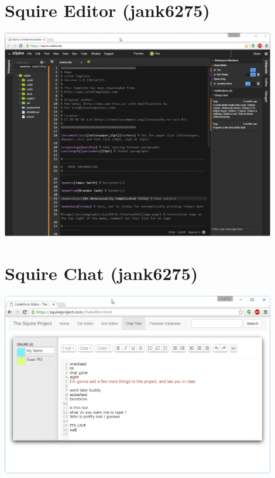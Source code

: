 \documentclass[11pt]{report}
\begin{document}
    \section{Squire Editor (jank6275)}
    \begin{minipage}{1\textwidth}
        \begin{center}
            \includegraphics[width=0.9\textwidth]{mockups/mockup-editor-jank6275}
        \end{center}
    \end{minipage}
    
    \section{Squire Chat (jank6275)}
    \begin{minipage}{1\textwidth}
        \begin{center}
            \includegraphics[width=0.9\textwidth]{mockups/mockup-communication-jank6275}
        \end{center}
    \end{minipage}
    
\end{document}
